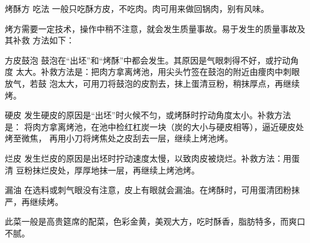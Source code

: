 \begin{recipe}{烤酥方}
\step 吃法 一般只吃酥方皮，不吃肉。肉可用来做回锅肉，别有风味。

\notes

烤方需要一定技术，操作中稍不注意，就会发生质量事故。易于发生的质量事故及其补救
方法如下：

\step 方皮鼓泡 鼓泡在“出坯”和“烤酥”中都会发生。其原因是气眼刺得不好，或拧动角度
太大。补救方法是：把肉方拿离烤池，用尖头竹签在鼓泡的附近由痩肉中刺眼放气，若鼓
泡太大，可用刀将鼓泡的皮割去，抹上蛋清豆粉，稍抹厚点，再继续烤。

\step 硬皮 发生硬皮的原因是“出坯”时火候不匀，或烤酥时拧动角度太小。补救方法是：
将肉方拿离烤池，在池中检红杠炭一块（炭的大小与硬皮相等），逼近硬皮处烤至微焦，
再用小刀将烤焦处之皮刮去一层，继续上烤池烤。

\step 烂皮 发生烂皮的原因是出坯时拧动速度太慢，以致肉皮被烧烂。补救方法：用蛋清
豆粉抹烂皮处，厚厚地抹一层，再继续上烤池烤。

\step 漏油 在选料或刺气眼没有注意，皮上有眼就会漏油。在烤酥时，可用蛋清团粉抹
严，再继续烤。

\features

此菜一般是高贵筵席的配菜，色彩金黄，美观大方，吃时酥香，脂肪特多，而爽口不腻。


\end{recipe}

